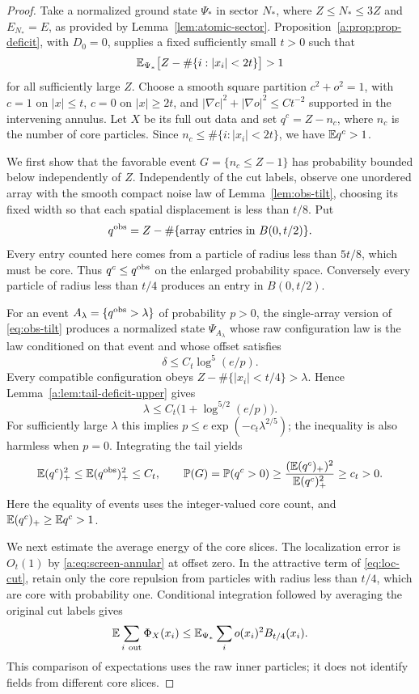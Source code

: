 \begin{proof}
Take a normalized ground state $\Psi_*$ in sector $N_*$, where
$Z\le N_*\le3Z$ and $E_{N_*}=E$, as provided by
Lemma~\ref{lem:atomic-sector}.  Proposition~\ref{a:prop:prop-deficit}, with
$D_0=0$, supplies a fixed sufficiently small $t>0$ such that
\[
 \mathbb E_{\Psi_*}\big[Z-\#\{i:|x_i|<2t\}\big]>1
\]
for all sufficiently large $Z$.  Choose a smooth square partition
$c^2+o^2=1$, with $c=1$ on $|x|\le t$, $c=0$ on $|x|\ge2t$, and
$|\nabla c|^2+|\nabla o|^2\le C t^{-2}$ supported in the intervening
annulus.  Let $X$ be its full out data and set
$q^c=Z-n_c$, where $n_c$ is the number of core particles.  Since
$n_c\le\#\{i:|x_i|<2t\}$, we have $\mathbb E q^c>1$.

We first show that the favorable event $G=\{n_c\le Z-1\}$ has
probability bounded below independently of $Z$.  Independently of the
cut labels, observe one unordered array with the smooth compact noise
law of Lemma~\ref{lem:obs-tilt}, choosing its fixed width so that each
spatial displacement is less than $t/8$.  Put
\[
 q^{\rm obs}=Z-\#\{\text{array entries in }B(0,t/2)\}.
\]
Every entry counted here comes from a particle of radius less than
$5t/8$, which must be core.  Thus $q^c\le q^{\rm obs}$ on the enlarged
probability space.  Conversely every particle of radius less than
$t/4$ produces an entry in $B(0,t/2)$.

For an event $A_\lambda=\{q^{\rm obs}>\lambda\}$ of probability
$p>0$, the single-array version of \eqref{eq:obs-tilt} produces a
normalized state $\Psi_{A_\lambda}$ whose raw configuration law is the
law conditioned on that event and whose offset satisfies
\[
 \delta\le C_t\log^5(e/p).
\]
Every compatible configuration obeys
$Z-\#\{|x_i|<t/4\}>\lambda$.  Hence
Lemma~\ref{a:lem:tail-deficit-upper} gives
\[
 \lambda\le C_t\big(1+\log^{5/2}(e/p)\big).
\]
For sufficiently large $\lambda$ this implies
$p\le e\exp(-c_t\lambda^{2/5})$; the inequality is also harmless when
$p=0$.  Integrating the tail yields
\begin{equation}\label{a:eq:tail-favorable-probability}
 \mathbb E(q^c)_+^2\le\mathbb E(q^{\rm obs})_+^2\le C_t,
 \qquad
 \mathbb P(G)=\mathbb P(q^c>0)
 \ge\frac{(\mathbb E(q^c)_+)^2}{\mathbb E(q^c)_+^2}\ge c_t>0.
\end{equation}
Here the equality of events uses the integer-valued core count, and
$\mathbb E(q^c)_+\ge\mathbb E q^c>1$.

We next estimate the average energy of the core slices.  The
localization error is $O_t(1)$ by \eqref{a:eq:screen-annular} at offset
zero.  In the attractive term of \eqref{eq:loc-cut}, retain only
the core repulsion from particles with radius less than $t/4$, which
are core with probability one.  Conditional integration followed by
averaging the original cut labels gives
\begin{equation}\label{a:eq:tail-deletion-attraction}
 \mathbb E\sum_{i\ {\rm out}}\Phi_X(x_i)
 \le\mathbb E_{\Psi_*}\sum_i o(x_i)^2 B_{t/4}(x_i).
\end{equation}
This comparison of expectations uses the raw inner particles; it does
not identify fields from different core slices.


\end{proof}
